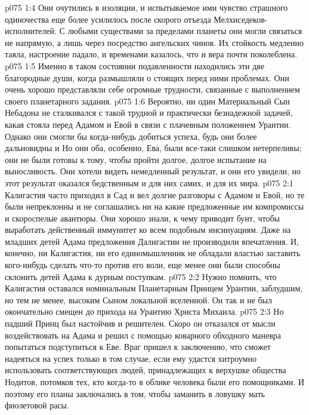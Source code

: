 \vs p075 1:4 Они очутились в изоляции, и испытываемое ими чувство страшного одиночества еще более усилилось после скорого отъезда Мелхиседеков\hyp{}исполнителей. С любыми существами за пределами планеты они могли связаться не напрямую, а лишь через посредство ангельских чинов. Их стойкость медленно таяла, настроение падало, и временами казалось, что и вера почти поколеблена.
\vs p075 1:5 Именно в таком состоянии подавленности находились эти две благородные души, когда размышляли о стоящих перед ними проблемах. Они очень хорошо представляли себе огромные трудности, связанные с выполнением своего планетарного задания.
\vs p075 1:6 Вероятно, ни один Материальный Сын Небадона не сталкивался с такой трудной и практически безнадежной задачей, какая стояла перед Адамом и Евой в связи с плачевным положением Урантии. Однако они смогли бы когда\hyp{}нибудь добиться успеха, будь они более дальновидны и  Но они оба, особенно, Ева, были все\hyp{}таки слишком нетерпеливы; они не были готовы к тому, чтобы пройти долгое, долгое испытание на выносливость. Они хотели видеть немедленный результат, и они его увидели, но этот результат оказался бедственным и для них самих, и для их мира.
\vs p075 2:1 Калигастия часто приходил в Сад и вел долгие разговоры с Адамом и Евой, но те были непреклонны и не соглашались ни на какие предложенные им компромиссы и скороспелые авантюры. Они хорошо знали, к чему приводит бунт, чтобы выработать действенный иммунитет ко всем подобным инсинуациям. Даже на младших детей Адама предложения Далигастии не производили впечатления. И, конечно, ни Калигастия, ни его единомышленник не обладали властью заставить кого\hyp{}нибудь сделать что\hyp{}то против его воли, еще менее они были способны склонить детей Адама к дурным поступкам.
\vs p075 2:2 Нужно помнить, что Калигастия оставался номинальным Планетарным Принцем Урантии, заблудшим, но тем не менее, высоким Сыном локальной вселенной. Он так и не был окончательно смещен до прихода на Урантию Христа Михаила.
\vs p075 2:3 Но падший Принц был настойчив и решителен. Скоро он отказался от мысли воздействовать на Адама и решил с помощью коварного обходного маневра попытаться подступиться к Еве. Враг пришел к заключению, что сможет надеяться на успех только в том случае, если ему удастся хитроумно использовать соответствующих людей, принадлежащих к верхушке общества Нодитов, потомков тех, кто когда\hyp{}то в облике человека были его помощниками. И поэтому его планы заключались в том, чтобы заманить в ловушку мать фиолетовой расы.
